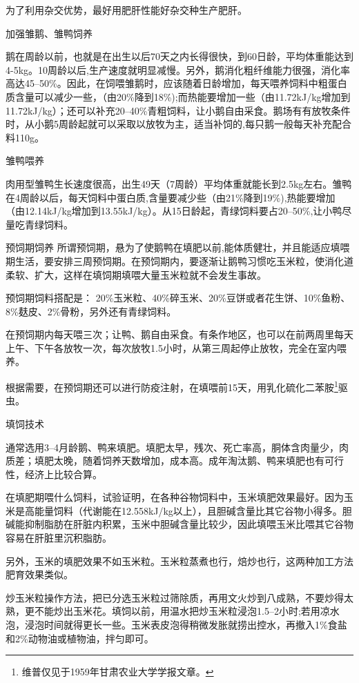 \documentclass{ctexbook}
\begin{document}
为了利用杂交优势，最好用肥肝性能好杂交种生产肥肝。

加强雏鹅、雏鸭饲养

鹅在周龄以前，也就是在出生以后70天之内长得很快，到60日龄，平均体重能达到4-5kg。10周龄以后,生产速度就明显减慢。另外，鹅消化粗纤维能力很强，消化率高达45--50\%。因此，在饲喂雏鹅时，应该随着日龄增加，每天喂养饲料中粗蛋白质含量可以减少一些，（由20\%降到18\%);而热能要增加一些（由11.72kJ/kg增加到11.72kJ/kg）；还可以补充20--40\%青粗饲料，让小鹅自由采食。鹅场有有放牧条件时，从小鹅5周龄起就可以采取以放牧为主，适当补饲的,每只鹅一般每天补充配合料110g。

雏鸭喂养

肉用型雏鸭生长速度很高，出生49天（7周龄）平均体重就能长到2.5kg左右。雏鸭在4周龄以后，每天饲料中蛋白质,含量要减少些（由21\%降到19\%),热能要增加（由12.14kJ/kg增加到13.55kJ/kg）。从15日龄起，青绿饲料要占20--50\%,让小鸭尽量吃青绿饲料。

预饲期饲养
所谓预饲期，悬为了使鹅鸭在填肥以前,能体质健壮，并且能适应填喂期生活，要安排三周预饲期。在预饲期内，要逐渐让鹅鸭习惯吃玉米粒，使消化道柔软、扩大，这样在填饲期填喂大量玉米粒就不会发生事故。

预饲期饲料搭配是：
20\%玉米粒、40\%碎玉米、20\%豆饼或者花生饼、10\%鱼粉、8\%麸皮、2\%骨粉，另外还有青绿饲料。

在预饲期内每天喂三次；让鸭、鹅自由采食。有条作地区，也可以在前两周里每天上午、下午各放牧一次，每次放牧1.5小时，从第三周起停止放牧，完全在室内喂养。

根据需要，在预饲期还可以进行防疫注射，在填喂前15天，用乳化硫化二苯胺\footnote{维普仅见于1959年甘肃农业大学学报文章。}驱虫。

填饲技术

通常选用3--4月龄鹅、鸭来填肥。填肥太早，残次、死亡率高，胴体含肉量少，肉质差；填肥太晚，随着饲养天数增加，成本高。成年淘汰鹅、鸭来填肥也有可行性，经济上比较合算。

在填肥期喂什么饲料，试验证明，在各种谷物饲料中，玉米填肥效果最好。因为玉米是高能量饲料（代谢能在12.558kJ/kg以上），且胆碱含量比其它谷物小得多。胆碱能抑制脂肪在肝脏内积累，玉米中胆碱含量比较少，因此填喂玉米比喂其它谷物容易在肝脏里沉积脂肪。

另外，玉米的填肥效果不如玉米粒。玉米粒蒸煮也行，焙炒也行，这两种加工方法肥育效果类似。

炒玉米粒操作方法，把已分选玉米粒过筛除质，再用文火炒到八成熟，不要炒得太熟，更不能炒出玉米花。填饲以前，用温水把炒玉米粒浸泡1.5--2小时;若用凉水泡，浸泡时间就得更长一些。玉米表皮泡得稍微发胀就捞出控水，再撤入1\%食盐和2\%动物油或植物油，拌匀即可。
\end{document}
